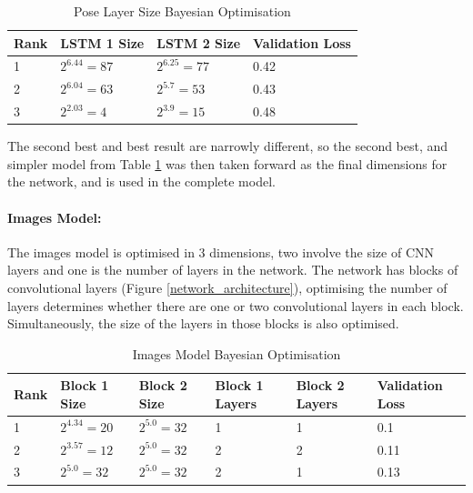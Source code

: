 \documentclass[11pt,twoside]{report}
\begin{document}
\noindent \begin{table}[h!]
	\centering
	\begin{tabular}{|p{1.0cm}|p{3.0cm}|p{3.0cm}|p{3.0cm}|}
		\hline
		\textbf{Rank}&\textbf{LSTM 1 Size} & \textbf{LSTM 2 Size} &  \textbf{Validation Loss}       \\ \hline
		1  & $2^{6.44} = 87$   &  $2^{6.25}=77$ & 0.42     \\ \hline
		2  & $2^{6.04}=63$   &  $2^{5.7}=53$ & 0.43   \\ \hline
		3  & $2^{2.03}=4$    & $2^{3.9}=15$ & 0.48   \\ \hline
		
	\end{tabular}
	\caption{Pose Layer Size Bayesian Optimisation}
	\label{pose_bayes_table}
\end{table}

The second best and best result are narrowly different, so the second best, and simpler model from Table \ref{pose_bayes_table} was then taken forward as the final dimensions for the network, and is used in the complete model.

\paragraph{Images Model:}
The images model is optimised in 3 dimensions, two involve the size of CNN layers and one is the number of layers in the network. The network has blocks of convolutional layers (Figure \ref{network_architecture}), optimising the number of layers determines whether there are one or two convolutional layers in each block. Simultaneously, the size of the layers in those blocks is also optimised.


\noindent \begin{table}[h!]
	\centering
	\begin{tabular}{|p{1.0cm}|p{2.3cm}|p{2.3cm}|p{1.5cm}|p{1.5cm}|p{2.2cm}|}
		\hline
		\textbf{Rank}&\textbf{Block 1 Size} & \textbf{Block 2 Size} &  \textbf{Block 1 Layers}   &  \textbf{Block 2 Layers} &  \textbf{Validation Loss}     \\ \hline
		1  & $2^{4.34} = 20$   &  $2^{5.0}=32$ & 1 & 1 & 0.1     \\ \hline
		2  & $2^{3.57}=12$   &  $2^{5.0}=32$ & 2 & 2 & 0.11   \\ \hline
		3  & $2^{5.0}=32$    & $2^{5.0}=32$ & 2 & 1 &  0.13   \\ \hline
		
	\end{tabular}
	\caption{Images Model Bayesian Optimisation}
	\label{images_bayes_table}
\end{table}
\end{document}
